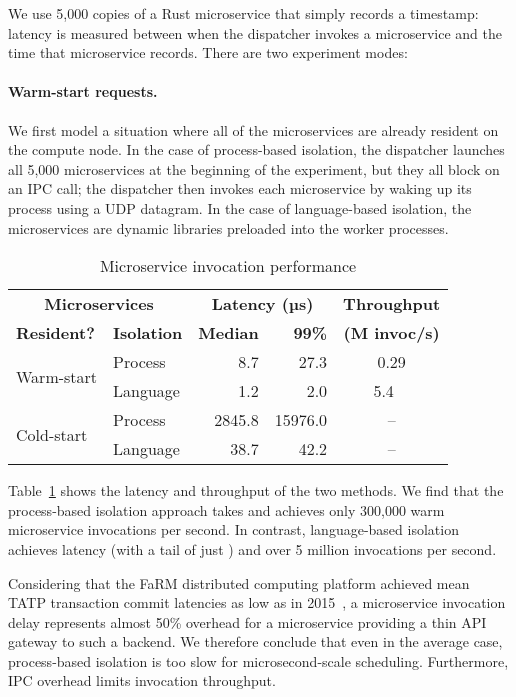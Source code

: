\noindent
We use 5,000 copies of a Rust microservice that simply records a timestamp:\@
latency is measured between when the dispatcher invokes a microservice
and the time that microservice records.  There are two experiment modes:

\paragraph{Warm-start requests.}
We first model a situation where all of the microservices are already resident on the
compute node.  In the case of process-based isolation, the dispatcher launches all
5,000 microservices at the beginning of the experiment, but they all block on an IPC
call; the dispatcher then invokes each microservice by waking up its process using a
UDP datagram.  In the case of language-based isolation, the microservices are
dynamic libraries preloaded into the worker processes.

\begin{table}
\begin{center}
\small
\begin{tabular}{@{}llrrc@{}}
  \multicolumn{2}{c}{\textbf{Microservices}} & \multicolumn{2}{c}{\textbf{Latency (µs)}} & \textbf{Throughput} \\
  \textbf{Resident?} & \textbf{Isolation} & \textbf{Median} & \textbf{99\%} & \textbf{(M invoc/s)} \\
\midrule
\multirow{2}{*}{Warm-start} & Process & 8.7 & 27.3 & 0.29 \\
& Language & 1.2 & 2.0 & 5.4~~ \\
\midrule
\multirow{2}{*}{Cold-start} & Process & 2845.8 & 15976.0 & \multicolumn{1}{c}{--} \\
& Language & 38.7 & 42.2 & \multicolumn{1}{c}{--} \\
\end{tabular}
\caption{Microservice invocation performance}
\label{tab:invocperf}
\end{center}
\end{table}

Table~\ref{tab:invocperf} shows the latency and throughput of the two
methods.  We find that the process-based isolation approach takes  and achieves
only 300,000 warm microservice invocations per second. In contrast, language-based
isolation achieves  latency (with a tail of just ) and over 5 million
invocations per second.

Considering that the FaRM distributed computing platform
achieved mean TATP transaction commit latencies as low as
 in 2015~\cite{Dragojevic:sosp2015}, a  microservice invocation delay
represents almost 50\% overhead for a microservice providing a thin API
gateway to such a backend.  We therefore conclude that even in the average
case, process-based isolation is too slow for microsecond-scale scheduling.
Furthermore, IPC overhead limits invocation throughput.

